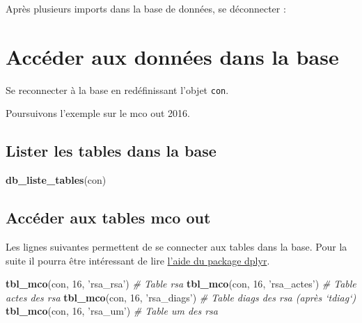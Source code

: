 \documentclass[]{book}
\newenvironment{Shaded}{\begin{snugshade}}{\end{snugshade}}
\newcommand{\KeywordTok}[1]{\textcolor[rgb]{0.13,0.29,0.53}{\textbf{#1}}}
\newcommand{\DecValTok}[1]{\textcolor[rgb]{0.00,0.00,0.81}{#1}}
\newcommand{\StringTok}[1]{\textcolor[rgb]{0.31,0.60,0.02}{#1}}
\newcommand{\CommentTok}[1]{\textcolor[rgb]{0.56,0.35,0.01}{\textit{#1}}}
\newcommand{\OperatorTok}[1]{\textcolor[rgb]{0.81,0.36,0.00}{\textbf{#1}}}
\newcommand{\NormalTok}[1]{#1}
\begin{document}
Après plusieurs imports dans la base de données, se déconnecter :

\begin{Shaded}
\end{Shaded}

\section{Accéder aux données dans la
base}\label{acceder-aux-donnees-dans-la-base}

Se reconnecter à la base en redéfinissant l'objet \texttt{con}.

Poursuivons l'exemple sur le mco out 2016.

\subsection{Lister les tables dans la
base}\label{lister-les-tables-dans-la-base}

\begin{Shaded}
\begin{Highlighting}[]
\KeywordTok{db_liste_tables}\NormalTok{(con)}
\end{Highlighting}
\end{Shaded}

\subsection{Accéder aux tables mco
out}\label{acceder-aux-tables-mco-out}

Les lignes suivantes permettent de se connecter aux tables dans la base.
Pour la suite il pourra être intéressant de lire
\href{http://db.rstudio.com/dplyr/}{l'aide du package dplyr}.

\begin{Shaded}
\begin{Highlighting}[]
\KeywordTok{tbl_mco}\NormalTok{(con, }\DecValTok{16}\NormalTok{, }\StringTok{'rsa_rsa'}\NormalTok{) }\CommentTok{# Table rsa}
\KeywordTok{tbl_mco}\NormalTok{(con, }\DecValTok{16}\NormalTok{, }\StringTok{'rsa_actes'}\NormalTok{) }\CommentTok{# Table actes des rsa}
\KeywordTok{tbl_mco}\NormalTok{(con, }\DecValTok{16}\NormalTok{, }\StringTok{'rsa_diags'}\NormalTok{) }\CommentTok{# Table diags des rsa (après `tdiag`)}
\KeywordTok{tbl_mco}\NormalTok{(con, }\DecValTok{16}\NormalTok{, }\StringTok{'rsa_um'}\NormalTok{) }\CommentTok{# Table um des rsa }
\end{Highlighting}
\end{Shaded}
\end{document}

